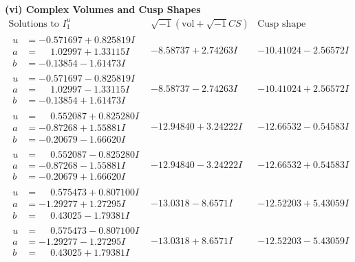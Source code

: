 \documentclass[1p]{elsarticle_modified}
\theoremstyle{definition}
\newcommand{\I}{\sqrt{-1}}
\begin{document}
\newpage\flushleft \textbf{(vi) Complex Volumes and Cusp Shapes}
$$\begin{array}{c|c|c}  
\text{Solutions to }I^u_{1}& \I (\text{vol} + \sqrt{-1}CS) & \text{Cusp shape}\\
 \hline 
\begin{aligned}
u &= -0.571697 + 0.825819 I \\
a &= \phantom{-}1.02997 + 1.33115 I \\
b &= -0.13854 - 1.61473 I\end{aligned}
 & -8.58737 + 2.74263 I & -10.41024 - 2.56572 I \\ \hline\begin{aligned}
u &= -0.571697 - 0.825819 I \\
a &= \phantom{-}1.02997 - 1.33115 I \\
b &= -0.13854 + 1.61473 I\end{aligned}
 & -8.58737 - 2.74263 I & -10.41024 + 2.56572 I \\ \hline\begin{aligned}
u &= \phantom{-}0.552087 + 0.825280 I \\
a &= -0.87268 + 1.55881 I \\
b &= -0.20679 - 1.66620 I\end{aligned}
 & -12.94840 + 3.24222 I & -12.66532 - 0.54583 I \\ \hline\begin{aligned}
u &= \phantom{-}0.552087 - 0.825280 I \\
a &= -0.87268 - 1.55881 I \\
b &= -0.20679 + 1.66620 I\end{aligned}
 & -12.94840 - 3.24222 I & -12.66532 + 0.54583 I \\ \hline\begin{aligned}
u &= \phantom{-}0.575473 + 0.807100 I \\
a &= -1.29277 + 1.27295 I \\
b &= \phantom{-}0.43025 - 1.79381 I\end{aligned}
 & -13.0318 - 8.6571 I & -12.52203 + 5.43059 I \\ \hline\begin{aligned}
u &= \phantom{-}0.575473 - 0.807100 I \\
a &= -1.29277 - 1.27295 I \\
b &= \phantom{-}0.43025 + 1.79381 I\end{aligned}
 & -13.0318 + 8.6571 I & -12.52203 - 5.43059 I \\ \hline\begin{aligned}

\end{aligned}
\end{array}$$
\end{document}

